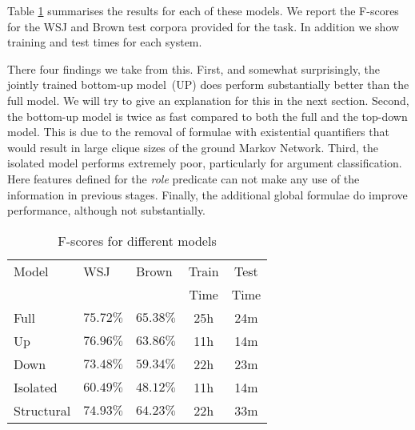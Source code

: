 Table \ref{tbl:results} summarises the results for each of these models. We report the F-scores for the WSJ and Brown test corpora provided for the task. In addition we show training and test times for each system. 

There four findings we take from this. First, and somewhat surprisingly, the jointly trained bottom-up model~(UP) does perform substantially better than the full model. We will try to give an explanation for this in the next section. Second, the bottom-up model is twice as fast compared to both the full and the top-down model. This is due to the removal of formulae with existential quantifiers that would result in large clique sizes of the ground Markov Network. Third, the isolated model performs extremely poor, particularly for argument classification. Here features defined for the \emph{role} predicate can not make any use of the information in previous stages. Finally, the additional global formulae do improve performance, although not substantially.


\begin{table}
\begin{center}
\small
\begin{tabular}{|l|l|l|c|c|}\hline
Model                & WSJ                & Brown              & Train & Test\\
                     &                    &                    & Time & Time\\\hline\hline
Full         & $75.72\%$          & $\mathbf{65.38}\%$ & 25h & 24m\\\hline
Up            & $\mathbf{76.96\%}$ & $63.86\%$          & 11h & 14m\\\hline
Down             & $73.48\%$          & $59.34\%$          & 22h & 23m\\\hline
Isolated   & $60.49\%$          & $48.12\%$          & 11h & 14m\\\hline
Structural & $74.93\%$       & $64.23\%$          & 22h & 33m\\\hline   
\end{tabular}
\caption{F-scores for different models}
\label{tbl:results}
\normalsize
\end{center}
\end{table}



